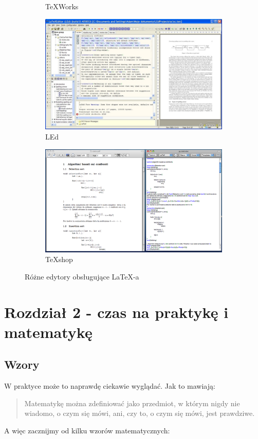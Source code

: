 \documentclass{article}
\begin{document}
\begin{figure}[h!]
\begin{subfigure}[b]{0.4\linewidth}
    \caption{TeXWorks}
  \end{subfigure}
  \begin{subfigure}[b]{0.4\linewidth}
    \includegraphics[width=\linewidth]{led.jpeg}
    \caption{LEd}
  \end{subfigure}
  \begin{subfigure}[b]{0.4\linewidth}
    \includegraphics[width=\linewidth]{texshop.png}
    \caption{TeXshop}
  \end{subfigure}
  \caption{Różne edytory obsługujące LaTeX-a}
  \label{fig:edytory}
\end{figure}


\newpage
\section{Rozdział 2 - czas na praktykę i matematykę}
\subsection{Wzory}
W praktyce może to naprawdę ciekawie wyglądać. Jak to mawiają: \begin{quote}Matematykę można zdefiniować jako przedmiot, w którym nigdy nie wiadomo, o czym się mówi, ani, czy to, o czym się mówi, jest prawdziwe. \end{quote} A więc zacznijmy od kilku wzorów matematycznych: 
\end{document}
